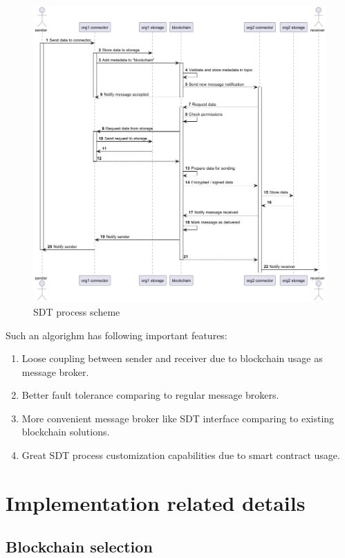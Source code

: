 \documentclass[10pt]{llncs}
\begin{document}
\begin{figure}
    \includegraphics[width=\textwidth]{sending_process.png}
    \caption{SDT process scheme} \label{sending_process}
\end{figure}

Such an algorighm has following important features:

\begin{enumerate}
    \item Loose coupling between sender and receiver due to blockchain usage as message broker.
    \item Better fault tolerance comparing to regular message brokers.
    \item More convenient message broker like SDT interface comparing to existing blockchain solutions.
    \item Great SDT process customization capabilities due to smart contract usage.
\end{enumerate}

\section{Implementation related details} \label{implementation_details}

\subsection{Blockchain selection}
\end{document}
